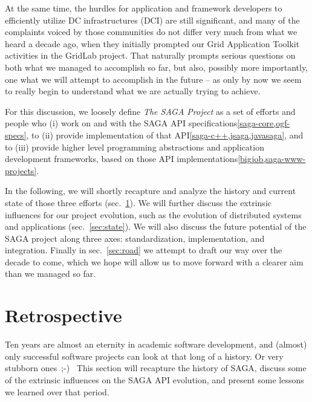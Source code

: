 \documentclass{article}
\newcommand{\I}[1]{\textit{#1}}
\newcommand{\smilie}{\small;-)~\xspace}
\begin{document}
At the same time, the hurdles for application and framework developers
to efficiently utilize DC infrastructures (DCI) are still significant,
and many of the complaints voiced by those communities do not differ
very much from what we heard a decade ago, when they initially
prompted our Grid Application Toolkit activities in the GridLab
project.  That naturally prompts serious questions on both what we
managed to accomplish so far, but also, possibly more importantly, one
what we will attempt to accomplish in the future -- as only by now we
seem to really begin to understand what we are actually trying to
achieve.  
 
For this discussion, we loosely define \I{The SAGA Project} as a set
of efforts and people who (i) work on and with the SAGA API
specifications\ref{saga-core,ogf-specs}, to (ii) provide
implementation of that API\ref{saga-c++,jsaga,javasaga}, and to (iii)
provide higher level programming abstractions and application
development frameworks, based on those API
implementations\ref{bigjob,saga-www-projects}.  

In the following, we will shortly recapture and analyze the history
and current state of those three efforts (sec.~\ref{sec:retro}).  We
will further discuss the extrinsic influences for our project
evolution, such as the evolution of distributed systems and
applications (sec.~\ref{sec:state}).  We will also discuss the future
potential of the SAGA project along three axes: standardization,
implementation, and integration.  Finally in sec.~\ref{sec:road} we
attempt to draft our way over the decade to come, which we hope will
allow us to move forward with a clearer aim than we managed so far.



\section{Retrospective}
\label{sec:retro}

 Ten years are almost an eternity in academic software development,
 and (almost) only successful software projects can look at that long
 of a history.  Or very stubborn ones~\smilie  This section will
 recapture the history of SAGA, discuss some of the extrinsic
 influences on the SAGA API evolution, and present some lessons we
 learned over that period.
\end{document}
